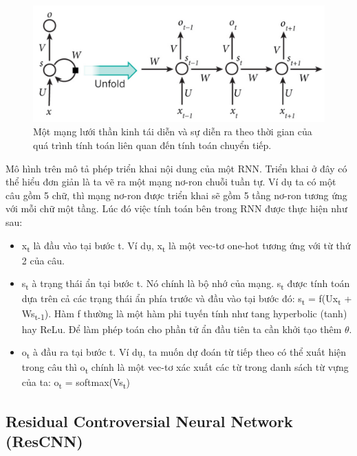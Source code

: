 \documentclass[conference]{IEEEtran}
\begin{document}
\begin{figure}[H]
    \centering
    \begin{minipage}{0.43\textwidth}
        \centering
        \includegraphics[width=1\textwidth]{bibliography/figure/RNN/RNN.pdf}
        \caption{Một mạng lưới thần kinh tái diễn và sự diễn ra theo thời gian của quá trình tính toán liên quan đến tính toán chuyển tiếp.}
        \label{fig:RNN}
    \end{minipage}

\end{figure}

Mô hình trên mô tả phép triển khai nội dung của một RNN. Triển khai ở đây có thể hiểu đơn giản là ta vẽ ra một mạng nơ-ron chuỗi tuần tự. Ví dụ ta có một câu gồm 5 chữ, thì mạng nơ-ron được triển khai sẽ gồm 5 tầng nơ-ron tương ứng với mỗi chữ một tầng. Lúc đó việc tính toán bên trong RNN được thực hiện như sau:
\begin{itemize}
    \item x\textsubscript{t} là đầu vào tại bước t. Ví dụ, x\textsubscript{t} là một vec-tơ one-hot tương ứng với từ thứ 2 của câu.
    \item s\textsubscript{t} à trạng thái ẩn tại bước t. Nó chính là bộ nhớ của mạng. s\textsubscript{t} được tính toán dựa trên cả các trạng thái ẩn phía trước và đầu vào tại bước đó: s\textsubscript{t} = f(Ux\textsubscript{t} +  Ws\textsubscript{t-1}). Hàm f thường là một hàm phi tuyến tính như tang hyperbolic (tanh) hay ReLu. Để làm phép toán cho phần tử ẩn đầu tiên ta cần khởi tạo thêm \(\theta \).
    \item o\textsubscript{t} à đầu ra tại bước t. Ví dụ, ta muốn dự đoán từ tiếp theo có thể xuất hiện trong câu thì o\textsubscript{t} chính là một vec-tơ xác xuất các từ trong danh sách từ vựng của ta: o\textsubscript{t} = softmax(Vs\textsubscript{t})
\end{itemize}


\subsection{Residual Controversial Neural Network (ResCNN)}
\end{document}
